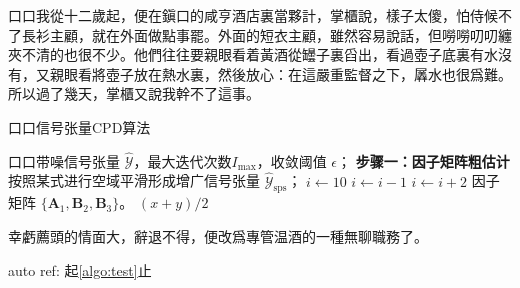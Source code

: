 \documentclass[type=bachelor]{bithesis}
\begin{document}
\frontmatter
\mainmatter

口口我從十二歲起，便在鎭口的咸亨酒店裏當夥計，掌櫃說，樣子太傻，怕侍候不了長衫主顧，就在外面做點事罷。外面的短衣主顧，雖然容易說話，但嘮嘮叨叨纏夾不清的也很不少。他們往往要親眼看着黃酒從罎子裏舀出，看過壺子底裏有水沒有，又親眼看將壺子放在熱水裏，然後放心：在這嚴重監督之下，羼水也很爲難。所以過了幾天，掌櫃又說我幹不了這事。

\begin{algorithm}[h]
  \caption{口口信号张量CPD算法} \label{algo:test}
  \begin{algorithmic}[1]
    \REQUIRE 口口带噪信号张量 $\hat{\mathcal{Y}}$，最大迭代次数$I_{\textrm{max}}$，收敛阈值 $\epsilon$；
    \STATE \textbf{步骤一：因子矩阵粗估计}
    \STATE 按照某式进行空域平滑形成增广信号张量 $\hat{\mathcal{Y}}_{\textrm{sps}}$；
    \STATE $i\gets 10$
    \STATE $i\gets i-1$
    \ELSE
    \STATE $i\gets i+2$
    \ENDIF
    \ENDIF
    \ENSURE 因子矩阵 $\{ \mathbf{A}_1, \mathbf{B}_2, \mathbf{B}_3 \}$。
    \RETURN $(x+y)/2$
  \end{algorithmic}
\end{algorithm}

幸虧薦頭的情面大，辭退不得，便改爲專管温酒的一種無聊職務了。

auto ref: 起\autoref{algo:test}止
\end{document}
